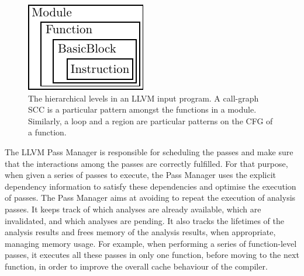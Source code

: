 \begin{figure}[h]
  \centering
  \includegraphics[scale=1]{figs/llvm-containers.pdf}
  \caption{The hierarchical levels in an LLVM input program. A call-graph SCC is a particular pattern amongst the functions in a module.
Similarly, a loop and a region are particular patterns on the CFG of a function.}
  \label{fig:llvm-containers}
\end{figure}


The LLVM Pass Manager is responsible for scheduling the passes and make sure that the interactions among the passes are correctly fulfilled.
For that purpose, when given a series of passes to execute, the Pass Manager uses the explicit dependency information to satisfy these dependencies and optimise the execution of passes.
The Pass Manager aims at avoiding to repeat the execution of analysis passes.
It keeps track of which analyses are already available, which are invalidated, and which analyses are pending.
It also tracks the lifetimes of the analysis results and frees memory of the analysis results, when appropriate, managing memory usage.
For example, when performing a series of function-level passes, it executes all these passes in only one function, before moving to the next function, in order to improve the overall cache behaviour of the compiler.

